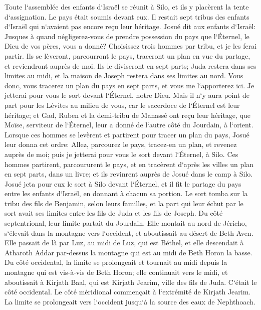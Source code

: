 \verse Toute l`assemblée des enfants d`Israël se réunit à Silo, et ils y placèrent la tente d`assignation. Le pays était soumis devant eux. 
\verse Il restait sept tribus des enfants d`Israël qui n`avaient pas encore reçu leur héritage. 
\verse Josué dit aux enfants d`Israël: Jusques à quand négligerez-vous de prendre possession du pays que l`Éternel, le Dieu de vos pères, vous a donné? 
\verse Choisissez trois hommes par tribu, et je les ferai partir. Ils se lèveront, parcourront le pays, traceront un plan en vue du partage, et reviendront auprès de moi. 
\verse Ils le diviseront en sept parts; Juda restera dans ses limites au midi, et la maison de Joseph restera dans ses limites au nord. 
\verse Vous donc, vous tracerez un plan du pays en sept parts, et vous me l`apporterez ici. Je jetterai pour vous le sort devant l`Éternel, notre Dieu. 
\verse Mais il n`y aura point de part pour les Lévites au milieu de vous, car le sacerdoce de l`Éternel est leur héritage; et Gad, Ruben et la demi-tribu de Manassé ont reçu leur héritage, que Moïse, serviteur de l`Éternel, leur a donné de l`autre côté du Jourdain, à l`orient. 
\verse Lorsque ces hommes se levèrent et partirent pour tracer un plan du pays, Josué leur donna cet ordre: Allez, parcourez le pays, tracez-en un plan, et revenez auprès de moi; puis je jetterai pour vous le sort devant l`Éternel, à Silo. 
\verse Ces hommes partirent, parcoururent le pays, et en tracèrent d`après les villes un plan en sept parts, dans un livre; et ils revinrent auprès de Josué dans le camp à Silo. 
\verse Josué jeta pour eux le sort à Silo devant l`Éternel, et il fit le partage du pays entre les enfants d`Israël, en donnant à chacun sa portion. 
\verse Le sort tomba sur la tribu des fils de Benjamin, selon leurs familles, et la part qui leur échut par le sort avait ses limites entre les fils de Juda et les fils de Joseph. 
\verse Du côté septentrional, leur limite partait du Jourdain. Elle montait au nord de Jéricho, s`élevait dans la montagne vers l`occident, et aboutissait au désert de Beth Aven. 
\verse Elle passait de là par Luz, au midi de Luz, qui est Béthel, et elle descendait à Atharoth Addar par-dessus la montagne qui est au midi de Beth Horon la basse. 
\verse Du côté occidental, la limite se prolongeait et tournait au midi depuis la montagne qui est vis-à-vis de Beth Horon; elle continuait vers le midi, et aboutissait à Kirjath Baal, qui est Kirjath Jearim, ville des fils de Juda. C`était le côté occidental. 
\verse Le côté méridional commençait à l`extrémité de Kirjath Jearim. La limite se prolongeait vers l`occident jusqu`à la source des eaux de Nephthoach. 
